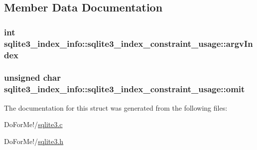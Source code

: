 \subsection{Member Data Documentation}
\hypertarget{structsqlite3__index__info_1_1sqlite3__index__constraint__usage_a2cbf680033c2937b3de226e091743a94}{
\subsubsection[{argv\-Index}]{\setlength{\rightskip}{0pt plus 5cm}int sqlite3\-\_\-index\-\_\-info\-::sqlite3\-\_\-index\-\_\-constraint\-\_\-usage\-::argv\-Index}}\label{structsqlite3__index__info_1_1sqlite3__index__constraint__usage_a2cbf680033c2937b3de226e091743a94}
\hypertarget{structsqlite3__index__info_1_1sqlite3__index__constraint__usage_ad07fa17d30e4fb3abe23ceaf84edf0ef}{
\subsubsection[{omit}]{\setlength{\rightskip}{0pt plus 5cm}unsigned char sqlite3\-\_\-index\-\_\-info\-::sqlite3\-\_\-index\-\_\-constraint\-\_\-usage\-::omit}}\label{structsqlite3__index__info_1_1sqlite3__index__constraint__usage_ad07fa17d30e4fb3abe23ceaf84edf0ef}


The documentation for this struct was generated from the following files\-:\begin{DoxyCompactItemize}
\item 
Do\-For\-Me!/\hyperlink{sqlite3_8c}{sqlite3.\-c}\item 
Do\-For\-Me!/\hyperlink{sqlite3_8h}{sqlite3.\-h}\end{DoxyCompactItemize}
